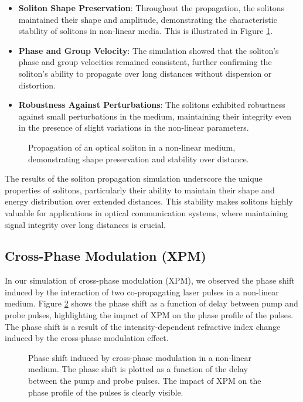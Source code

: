 \documentclass[12pt]{article}
\begin{document}
\begin{itemize}
    \item \textbf{Soliton Shape Preservation}: Throughout the propagation, the solitons maintained their shape and amplitude, demonstrating the characteristic stability of solitons in non-linear media. This is illustrated in Figure \ref{fig:soliton_propagation}.
    \item \textbf{Phase and Group Velocity}: The simulation showed that the soliton's phase and group velocities remained consistent, further confirming the soliton's ability to propagate over long distances without dispersion or distortion.
    \item \textbf{Robustness Against Perturbations}: The solitons exhibited robustness against small perturbations in the medium, maintaining their integrity even in the presence of slight variations in the non-linear parameters.
\end{itemize}

\begin{figure}[h!]
    \centering
    
    \caption{Propagation of an optical soliton in a non-linear medium, demonstrating shape preservation and stability over distance.}
    \label{fig:soliton_propagation}
\end{figure}

The results of the soliton propagation simulation underscore the unique properties of solitons, particularly their ability to maintain their shape and energy distribution over extended distances. This stability makes solitons highly valuable for applications in optical communication systems, where maintaining signal integrity over long distances is crucial.

\subsection{Cross-Phase Modulation (XPM)}

In our simulation of cross-phase modulation (XPM), we observed the phase shift induced by the interaction of two co-propagating laser pulses in a non-linear medium. Figure \ref{fig:xpm_phase_shift} shows the phase shift as a function of delay between pump and probe pulses, highlighting the impact of XPM on the phase profile of the pulses. The phase shift is a result of the intensity-dependent refractive index change induced by the cross-phase modulation effect.

\begin{figure}[!ht]
    \centering
    
    \caption{Phase shift induced by cross-phase modulation in a non-linear medium. The phase shift is plotted as a function of the delay between the pump and probe pulses. The impact of XPM on the phase profile of the pulses is clearly visible.}
    \label{fig:xpm_phase_shift}
\end{figure}
\end{document}
